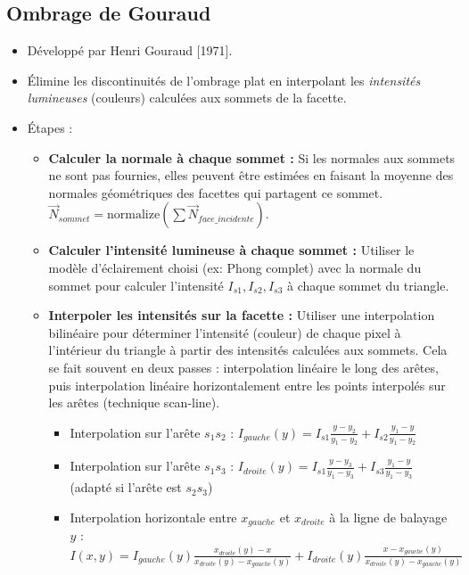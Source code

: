 \subsection{Ombrage de Gouraud}
\begin{itemize}
    \item Développé par Henri Gouraud [1971].
    \item Élimine les discontinuités de l'ombrage plat en interpolant les \textit{intensités lumineuses} (couleurs) calculées aux sommets de la facette.
    \item Étapes :
        \begin{itemize}
        \item \textbf{Calculer la normale à chaque sommet :} Si les normales aux sommets ne sont pas fournies, elles peuvent être estimées en faisant la moyenne des normales géométriques des facettes qui partagent ce sommet. \( \vec{N}_{sommet} = \text{normalize}(\sum \vec{N}_{face\_incidente}) \).
        \item \textbf{Calculer l'intensité lumineuse à chaque sommet :} Utiliser le modèle d'éclairement choisi (ex: Phong complet) avec la normale du sommet pour calculer l'intensité \(I_{s1}, I_{s2}, I_{s3}\) à chaque sommet du triangle.
        \item \textbf{Interpoler les intensités sur la facette :} Utiliser une interpolation bilinéaire pour déterminer l'intensité (couleur) de chaque pixel à l'intérieur du triangle à partir des intensités calculées aux sommets. Cela se fait souvent en deux passes : interpolation linéaire le long des arêtes, puis interpolation linéaire horizontalement entre les points interpolés sur les arêtes (technique scan-line).
           \begin{itemize}
               \item Interpolation sur l'arête \(s_1 s_2\) : \(I_{gauche}(y) = I_{s1} \frac{y - y_2}{y_1 - y_2} + I_{s2} \frac{y_1 - y}{y_1 - y_2}\)
               \item Interpolation sur l'arête \(s_1 s_3\) : \(I_{droite}(y) = I_{s1} \frac{y - y_3}{y_1 - y_3} + I_{s3} \frac{y_1 - y}{y_1 - y_3}\) (adapté si l'arête est \(s_2 s_3\))
               \item Interpolation horizontale entre \(x_{gauche}\) et \(x_{droite}\) à la ligne de balayage \(y\) : \(I(x, y) = I_{gauche}(y) \frac{x_{droite}(y) - x}{x_{droite}(y) - x_{gauche}(y)} + I_{droite}(y) \frac{x - x_{gauche}(y)}{x_{droite}(y) - x_{gauche}(y)}\)
           \end{itemize}
        \end{itemize}

\end{itemize}
